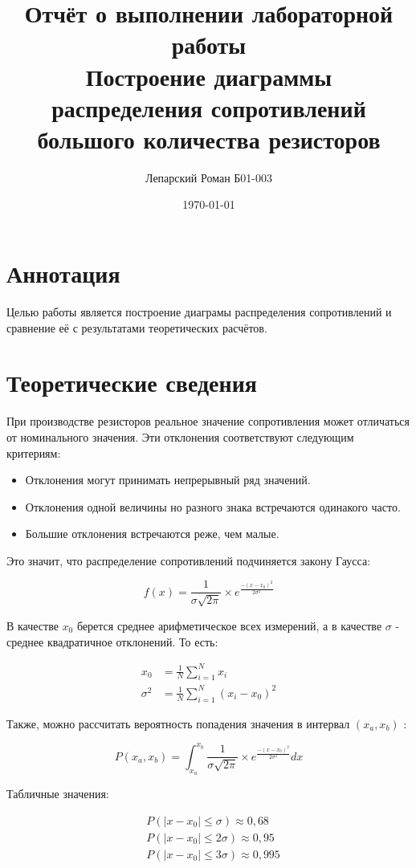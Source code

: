 \documentclass[a4paper, 12pt]{article}
\author{Лепарский Роман Б01-003}
\title{Отчёт о выполнении лабораторной работы \\ \vspace{5mm} Построение диаграммы распределения сопротивлений большого количества резисторов}
\date{\today}
\begin{document}
\maketitle

\newpage

\section{Аннотация}

Целью работы является построение диаграмы распределения сопротивлений и сравнение её с результатами теоретических расчётов.

\section{Теоретические сведения}

При производстве резисторов реальное значение сопротивления может отличаться от номинального значения.
Эти отклонения соответствуют следующим критериям:

\begin{itemize}
	\item{Отклонения могут принимать непрерывный ряд значений.}
	\item{Отклонения одной величины но разного знака встречаются одинакого часто.}
	\item{Большие отклонения встречаются реже, чем малые.}
\end{itemize}

Это значит, что распределение сопротивлений подчиняется закону Гаусса:

\[	
f(x) = \frac{1}{\sigma \sqrt{2\pi}}\times e^{\frac{-(x-x_0)^2}{2\sigma ^2}}
\]

В качестве $x_0$ берется среднее арифметическое всех измерений, а в качестве $\sigma$ - среднее квадратичное отклонений. То есть:

\begin{align*}
	x_0 &= \frac{1}{N}\sum_{i=1}^N x_i \\
	\sigma^2 &= \frac{1}{N}\sum_{i=1}^N (x_i - x_0)^2
\end{align*}

Также, можно рассчитать вероятность попадения значения в интервал $(x_a, x_b)$ :

\[
P(x_a, x_b) = \int_{x_a}^{x_b} \frac{1}{\sigma \sqrt{2\pi}}\times e^{\frac{-(x-x_0)^2}{2\sigma ^2}} dx
\]

Табличные значения:

\begin{align*}
	&P(|x - x_0| \leq \sigma) \approx 0,68  \\
	&P(|x - x_0| \leq 2\sigma) \approx 0,95  \\
	&P(|x - x_0| \leq 3\sigma) \approx 0,995
\end{align*}
\end{document}
